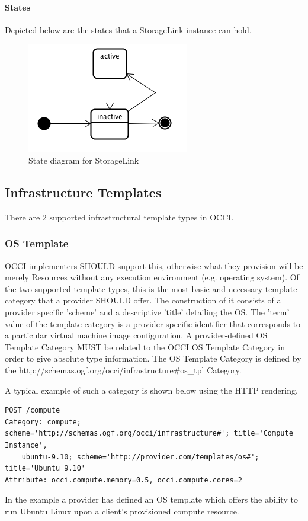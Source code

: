 \documentclass[10pt,a4paper]{article}
\begin{document}
\paragraph{States}
Depicted below are the states that a StorageLink instance can hold.

\begin{figure}[!h]
	\centering
	\includegraphics[scale=0.4]{figs/infra-link-state.png}
	\caption{State diagram for StorageLink}
	\label{fig:storagelink_state}
\end{figure}

\subsection{Infrastructure Templates}
There are 2 supported infrastructural template types in OCCI.

\subsubsection{OS Template}
OCCI implementers SHOULD support this, otherwise what they provision will be merely Resources without any execution environment (e.g. operating system). Of the two supported template types, this is the most basic and necessary template category that a provider SHOULD offer. The construction of it consists of a provider specific 'scheme' and a descriptive 'title' detailing the OS. The 'term' value of the template category is a provider specific identifier that corresponds to a particular virtual machine image configuration. A provider-defined OS Template Category MUST be related to the OCCI OS Template Category in order to give absolute type information. The OS Template Category is defined by the http://schemas.ogf.org/occi/infrastructure\#os\_tpl Category.

A typical example of such a category is shown below using the HTTP rendering. 

\begin{verbatim}
POST /compute
Category: compute; scheme='http://schemas.ogf.org/occi/infrastructure#'; title='Compute Instance', 
    ubuntu-9.10; scheme='http://provider.com/templates/os#'; title='Ubuntu 9.10'
Attribute: occi.compute.memory=0.5, occi.compute.cores=2
\end{verbatim}
In the example a provider has defined an OS template which offers the ability to run Ubuntu Linux upon a client's provisioned compute resource.
\end{document}
